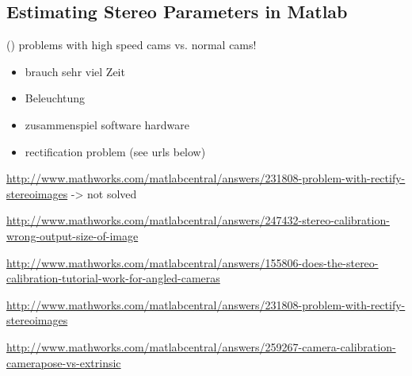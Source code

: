 \subsection{Estimating Stereo Parameters in Matlab}\label{ssec:estimateStereoParams}

(\cite{StereoCalib.2016})
problems with high speed cams vs. normal cams!
\begin{itemize}
\item brauch sehr viel Zeit
\item Beleuchtung
\item zusammenspiel software hardware
\item rectification problem (see urls below)
\end{itemize}



\url{http://www.mathworks.com/matlabcentral/answers/231808-problem-with-rectify-stereoimages}
-> not solved

\url{http://www.mathworks.com/matlabcentral/answers/247432-stereo-calibration-wrong-output-size-of-image}

\url{http://www.mathworks.com/matlabcentral/answers/155806-does-the-stereo-calibration-tutorial-work-for-angled-cameras}

\url{http://www.mathworks.com/matlabcentral/answers/231808-problem-with-rectify-stereoimages}

\url{http://www.mathworks.com/matlabcentral/answers/259267-camera-calibration-camerapose-vs-extrinsic}